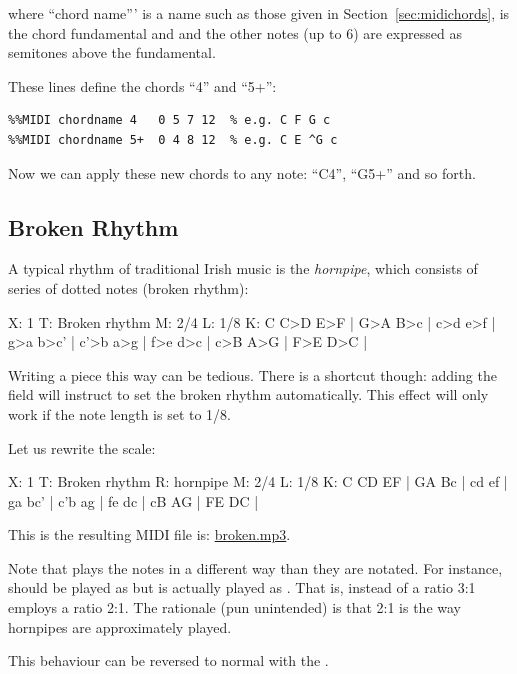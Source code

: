 \documentclass[a4paper,12pt]{book}
\begin{document}
\medskip

    
  

\medskip

where ``chord name''' is a name such as those given in
Section~\ref{sec:midichords},  is the chord fundamental and
and the other notes (up to 6) are expressed as semitones above the
fundamental.

These lines define the chords ``4'' and ``5+'':

\begin{verbatim}
%%MIDI chordname 4   0 5 7 12  % e.g. C F G c
%%MIDI chordname 5+  0 4 8 12  % e.g. C E ^G c
\end{verbatim}

Now we can apply these new chords to any note: ``C4'', ``G5+'' and so
forth.


\subsection{Broken Rhythm}
\label{sec:broken}

A typical rhythm of traditional Irish music is the \emph{hornpipe},
which consists of series of dotted notes (broken rhythm):

\begin{abcsource}
X: 1
T: Broken rhythm
M: 2/4
L: 1/8
K: C
C>D E>F  | G>A B>c | c>d e>f | g>a b>c' |
c'>b a>g | f>e d>c | c>B A>G | F>E D>C  |
\end{abcsource}

Writing a piece this way can be tedious. There is a shortcut though:
adding the  field will instruct \abcmid{} to set the
broken rhythm automatically. This effect will only work if the note
length is set to 1/8.

Let us rewrite the scale:

\begin{abcsource}
X: 1
T: Broken rhythm
R: hornpipe
M: 2/4
L: 1/8
K: C
CD EF  | GA Bc | cd ef | ga bc' |
c'b ag | fe dc | cB AG | FE DC  |
\end{abcsource}

This is the resulting MIDI file is: \href{run:broken.mp3}{broken.mp3}.

\begin{note}

  Note that \abcmid{} plays the notes in a different way than they are
  notated. For instance,  should be played as
   but is actually played as . That is,
  instead of a ratio 3:1 \abcmid{} employs a ratio 2:1. The rationale
  (pun unintended) is that 2:1 is the way hornpipes are approximately
  played.
  
  This behaviour can be reversed to normal with the .
  
\end{note}
\end{document}
